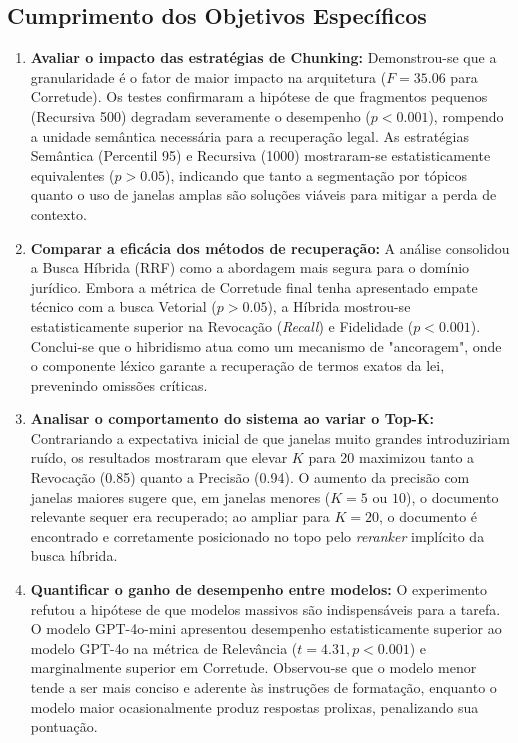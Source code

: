 \subsection{Cumprimento dos Objetivos Específicos}

\begin{enumerate}
  \item \textbf{Avaliar o impacto das estratégias de Chunking:} Demonstrou-se que a granularidade é o fator de maior impacto na arquitetura ($F = 35.06$ para Corretude). Os testes confirmaram a hipótese de que fragmentos pequenos (Recursiva 500) degradam severamente o desempenho ($p < 0.001$), rompendo a unidade semântica necessária para a recuperação legal. As estratégias Semântica (Percentil 95) e Recursiva (1000) mostraram-se estatisticamente equivalentes ($p > 0.05$), indicando que tanto a segmentação por tópicos quanto o uso de janelas amplas são soluções viáveis para mitigar a perda de contexto.

  \item \textbf{Comparar a eficácia dos métodos de recuperação:} A análise consolidou a Busca Híbrida (RRF) como a abordagem mais segura para o domínio jurídico. Embora a métrica de Corretude final tenha apresentado empate técnico com a busca Vetorial ($p > 0.05$), a Híbrida mostrou-se estatisticamente superior na Revocação (\textit{Recall}) e Fidelidade ($p < 0.001$). Conclui-se que o hibridismo atua como um mecanismo de "ancoragem", onde o componente léxico garante a recuperação de termos exatos da lei, prevenindo omissões críticas.

  \item \textbf{Analisar o comportamento do sistema ao variar o Top-K:} Contrariando a expectativa inicial de que janelas muito grandes introduziriam ruído, os resultados mostraram que elevar $K$ para 20 maximizou tanto a Revocação (0.85) quanto a Precisão (0.94). O aumento da precisão com janelas maiores sugere que, em janelas menores ($K = 5$ ou $10$), o documento relevante sequer era recuperado; ao ampliar para $K = 20$, o documento é encontrado e corretamente posicionado no topo pelo \textit{reranker} implícito da busca híbrida.

  \item \textbf{Quantificar o ganho de desempenho entre modelos:} O experimento refutou a hipótese de que modelos massivos são indispensáveis para a tarefa. O modelo GPT-4o-mini apresentou desempenho estatisticamente superior ao modelo GPT-4o na métrica de Relevância ($t = 4.31, p < 0.001$) e marginalmente superior em Corretude. Observou-se que o modelo menor tende a ser mais conciso e aderente às instruções de formatação, enquanto o modelo maior ocasionalmente produz respostas prolixas, penalizando sua pontuação.
\end{enumerate}
